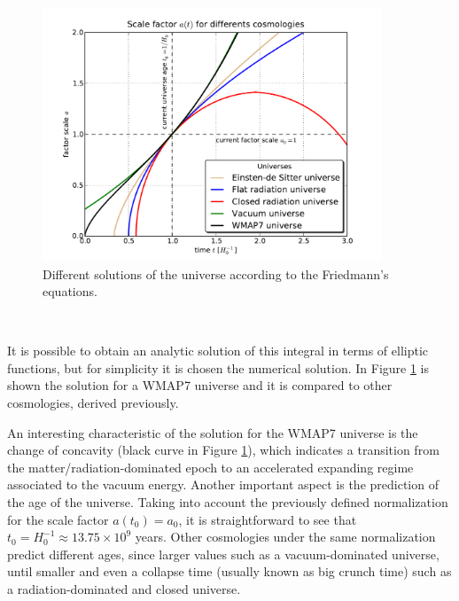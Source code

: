 \
\begin{figure}[htbp]
	\centering
	\includegraphics[width=0.9\textwidth]
	{./figures/2_theoretical_framework/Friedmann_Solution.pdf}

	\caption{\small{Different solutions of the universe according to the
	Friedmann's equations.}}
	
	\label{fig:Cosmologies}
\end{figure}
\

It is possible to obtain an analytic solution of this integral in terms of
elliptic functions, but for simplicity it is chosen the numerical solution.
In Figure \ref{fig:Cosmologies} is shown the solution for a WMAP7 
universe and it is compared to other cosmologies, derived previously.


An interesting characteristic of the solution for the WMAP7 universe is 
the change of concavity (black curve in Figure \ref{fig:Cosmologies}), 
which indicates a transition from the matter/radiation-dominated epoch
to an accelerated expanding regime associated to the vacuum energy.
Another important aspect is the prediction of the age of the universe.
Taking into account the previously defined normalization for the scale
factor $a(t_0) = a_0$, it is straightforward to see that $t_0 = H_0^{-1} 
\approx 13.75 \times 10^9$ years. Other cosmologies under the same 
normalization predict different ages, since larger values such as a 
vacuum-dominated universe, until smaller and even a collapse time (usually
known as big crunch time) such as a radiation-dominated and closed 
universe.



